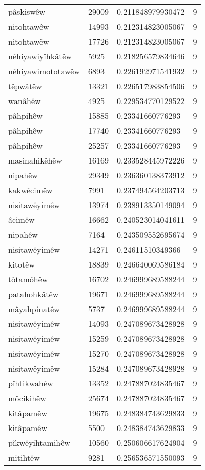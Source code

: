 \begin{longtable}{llll}
pâskiswêw & 29009 & 0.211848979930472 & 9\\
nitohtawêw & 14993 & 0.212314823005067 & 9\\
nitohtawêw & 17726 & 0.212314823005067 & 9\\
nêhiyawiyîhkâtêw & 5925 & 0.218256579834646 & 9\\
nêhiyawimototawêw & 6893 & 0.226192971541932 & 9\\
têpwâtêw & 13321 & 0.226517983854506 & 9\\
wanâhêw & 4925 & 0.229534770129522 & 9\\
pâhpihêw & 15885 & 0.23341660776293 & 9\\
pâhpihêw & 17740 & 0.23341660776293 & 9\\
pâhpihêw & 25257 & 0.23341660776293 & 9\\
masinahikêhêw & 16169 & 0.233528445972226 & 9\\
nipahêw & 29349 & 0.236360138373912 & 9\\
kakwêcimêw & 7991 & 0.237494564203713 & 9\\
nisitawêyimêw & 13974 & 0.238913350149094 & 9\\
âcimêw & 16662 & 0.240523014041611 & 9\\
nipahêw & 7164 & 0.243509552695674 & 9\\
nisitawêyimêw & 14271 & 0.24611510349366 & 9\\
kitotêw & 18839 & 0.246640069586184 & 9\\
tôtamôhêw & 16702 & 0.246999689588244 & 9\\
patahohkâtêw & 19671 & 0.246999689588244 & 9\\
mâyahpinatêw & 5737 & 0.246999689588244 & 9\\
nisitawêyimêw & 14093 & 0.247089673428928 & 9\\
nisitawêyimêw & 15259 & 0.247089673428928 & 9\\
nisitawêyimêw & 15270 & 0.247089673428928 & 9\\
nisitawêyimêw & 15284 & 0.247089673428928 & 9\\
pîhtikwahêw & 13352 & 0.247887024835467 & 9\\
môcikihêw & 25674 & 0.247887024835467 & 9\\
kitâpamêw & 19675 & 0.248384743629833 & 9\\
kitâpamêw & 5500 & 0.248384743629833 & 9\\
pîkwêyihtamihêw & 10560 & 0.250606617624904 & 9\\
mitihtêw & 9281 & 0.256536571550093 & 9\\

\end{longtable}
